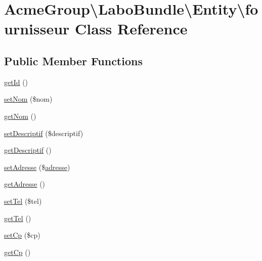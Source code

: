 \hypertarget{class_acme_group_1_1_labo_bundle_1_1_entity_1_1fournisseur}{\section{Acme\+Group\textbackslash{}Labo\+Bundle\textbackslash{}Entity\textbackslash{}fournisseur Class Reference}
\label{class_acme_group_1_1_labo_bundle_1_1_entity_1_1fournisseur}
}
\subsection*{Public Member Functions}
\begin{DoxyCompactItemize}
\item 
\hyperlink{class_acme_group_1_1_labo_bundle_1_1_entity_1_1fournisseur_a8801bcfa33d7bf7f41f518934b7e072e}{get\+Id} ()
\item 
\hyperlink{class_acme_group_1_1_labo_bundle_1_1_entity_1_1fournisseur_a0843188df6a592a79d0799548166dac9}{set\+Nom} (\$nom)
\item 
\hyperlink{class_acme_group_1_1_labo_bundle_1_1_entity_1_1fournisseur_a4af114524ff9645b5d6808505248630f}{get\+Nom} ()
\item 
\hyperlink{class_acme_group_1_1_labo_bundle_1_1_entity_1_1fournisseur_a8734f35dca4ce0dc90cf40d7d11d43f2}{set\+Descriptif} (\$descriptif)
\item 
\hyperlink{class_acme_group_1_1_labo_bundle_1_1_entity_1_1fournisseur_a8f75e8fd7d38d840517dc669c41b47aa}{get\+Descriptif} ()
\item 
\hyperlink{class_acme_group_1_1_labo_bundle_1_1_entity_1_1fournisseur_ab708bdc1bb9d4707600afe0d1ef751d5}{set\+Adresse} (\$\hyperlink{class_acme_group_1_1_labo_bundle_1_1_entity_1_1adresse}{adresse})
\item 
\hyperlink{class_acme_group_1_1_labo_bundle_1_1_entity_1_1fournisseur_abf09f92f5c4449b2aab330be41ec3e93}{get\+Adresse} ()
\item 
\hyperlink{class_acme_group_1_1_labo_bundle_1_1_entity_1_1fournisseur_ae3c123a35ca75a05336957c25899a347}{set\+Tel} (\$tel)
\item 
\hyperlink{class_acme_group_1_1_labo_bundle_1_1_entity_1_1fournisseur_af5684e69739f6332677a3f8cc9a63485}{get\+Tel} ()
\item 
\hyperlink{class_acme_group_1_1_labo_bundle_1_1_entity_1_1fournisseur_aa4736330e986bb830828d6d279240979}{set\+Cp} (\$cp)
\item 
\hyperlink{class_acme_group_1_1_labo_bundle_1_1_entity_1_1fournisseur_aaaddfaf6611ad9f3beb231dec3fcad7a}{get\+Cp} ()
\end{DoxyCompactItemize}


